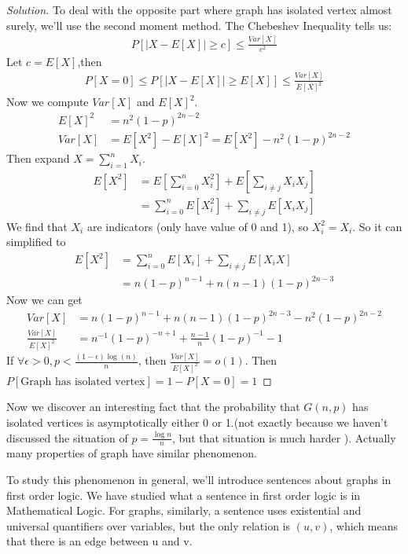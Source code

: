 \documentclass[a4paper, linespread=1.5]{article}
\begin{document}
\begin{proof}[Solution]
        To deal with the opposite part where graph has isolated vertex almost surely, we'll use the second moment method.
        The Chebeshev Inequality tells us:
        \begin{align}
            P[|X-E[X]|\ge c]\le \frac{Var[X]}{c^2}
        \end{align}
        Let $c=E[X]$,then
        \begin{align}
            P[X=0]\le P[|X-E[X]|\ge E[X]]\le \frac{Var[X]}{E[X]^2}
        \end{align}
        Now we compute $Var[X]$ and $E[X]^2$.
        \begin{align*}
            E[X]^2&=n^2(1-p)^{2n-2}\\
            Var[X]&=E[X^2]-E[X]^2=E[X^2]-n^2(1-p)^{2n-2}
        \end{align*}
        Then expand $X=\sum\limits_{i=1}^{n}X_i$.
        \begin{align*}
            E[X^2]&=E[\sum\limits_{i=0}^{n}X_i^2]+E[\sum\limits_{i\ne j}X_i X_j]\\
                  &=\sum\limits_{i=0}^{n}E[X_i^2]+\sum\limits_{i\ne j}E[X_i X_j]
        \end{align*}
        We find that $X_i$ are indicators (only have value of 0 and 1), so $X_i^2=X_i$.
        So it can simplified to
        \begin{align*}
            E[X^2]&=\sum\limits_{i=0}^{n}E[X_i]+\sum\limits_{i\ne j}E[X_i X]\\
                  &=n(1-p)^{n-1}+n(n-1)(1-p)^{2n-3}
        \end{align*}
        Now we can get
        \begin{align*}
            Var[X]&=n(1-p)^{n-1}+n(n-1)(1-p)^{2n-3}-n^2(1-p)^{2n-2}\\
            \frac{Var[X]}{E[X]^2}&=n^{-1}(1-p)^{-n+1}+\frac{n-1}{n}(1-p)^{-1}-1
        \end{align*}
        If $\forall \epsilon>0, p<\frac{(1-\epsilon)\log (n)}{n}$, then $ \frac{Var[X]}{E[X]^2}=o(1)$.
        Then $P[\text{Graph has isolated vertex}]=1-P[X=0]=1$
    \end{proof}
    Now we discover an interesting fact that the probability that $G(n,p)$ has isolated vertices is asymptotically either 0 or 1.(not exactly because we haven't discussed the situation of $p=\frac{\log n}{n}$, but that situation is much harder ).
    Actually many properties of graph have similar phenomenon.

    To study this phenomenon in general, we'll introduce sentences about graphs in first order logic.
    We have studied what a sentence in first order logic is in Mathematical Logic.
    For graphs, similarly, a sentence uses existential and universal quantifiers over variables, but the only relation is $(u,v)$, which means that there is an edge between u and v.
\end{document}
